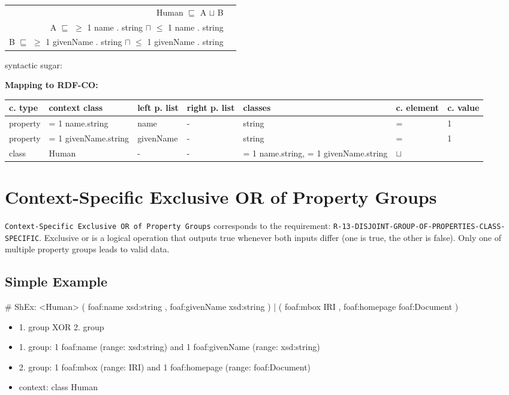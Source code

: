 \documentclass{llncs}
\newcommand{\ms}[1]{\texttt{#1}}
\newenvironment{gcotable}{
  \scriptsize
  \sffamily
  \vspace{0cm}
	\begin{center}
	\textbf{\vspace{0.4cm}Mapping to RDF-CO:} \\
  \begin{tabular}{l|l|l|l|l|l|l}
	\hline
  \textbf{c. type} & \textbf{context class} & \textbf{left p. list} & \textbf{right p. list} & \textbf{classes} & \textbf{c. element} & \textbf{c. value} \\
  \hline

}{
  \hline
  \end{tabular}
	\end{center}
}
\newenvironment{DL}{
  \vspace{0cm}
	\begin{center}
  \begin{tabular}{r l}

}{
  \end{tabular}
	\end{center}
}
\begin{document}
\begin{DL}
Human $\sqsubseteq$ A $\sqcup$ B \\
A $\sqsubseteq$ $\geq$ 1 name . string $\sqcap$ $\leq$ 1 name . string \\
B $\sqsubseteq$ $\geq$ 1 givenName . string $\sqcap$ $\leq$ 1 givenName . string \\
\end{DL}

syntactic sugar:
\begin{gcotable}
property & = 1 name.string & name & - & string & = & 1 \\
property & = 1 givenName.string & givenName & - & string & = & 1 \\
class & Human & - & - & = 1 name.string, = 1 givenName.string & $\sqcup$ \\
\end{gcotable}

\section{Context-Specific Exclusive OR of Property Groups}

\ms{Context-Specific Exclusive OR of Property Groups} corresponds to the requirement:
\ms{R-13-DISJOINT-GROUP-OF-PROPERTIES-CLASS-SPECIFIC}.
Exclusive or is a logical operation that outputs true whenever both inputs differ (one is true, the other is false).
Only one of multiple property groups leads to valid data.

\subsection{Simple Example}

\begin{ex}
# ShEx:
<Human> { 
    (  
        foaf:name xsd:string ,
        foaf:givenName xsd:string ) 
    |
    (
        foaf:mbox IRI ,
        foaf:homepage foaf:Document ) }
\end{ex}

\begin{itemize}
  \item 1. group XOR 2. group
	\item 1. group: 1 foaf:name (range: xsd:string) and 1 foaf:givenName (range: xsd:string)
	\item 2. group: 1 foaf:mbox (range: IRI) and 1 foaf:homepage (range: foaf:Document) 
	\item context: class Human
\end{itemize}
\end{document}

